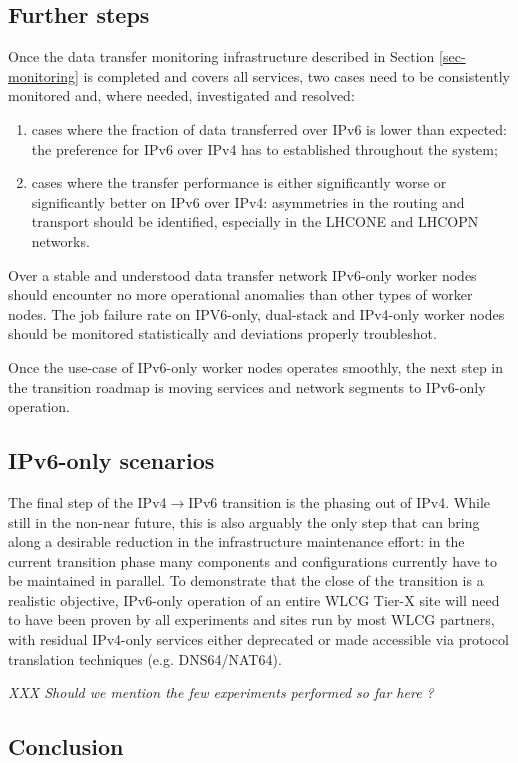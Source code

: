 \subsection{Further steps}
Once the data transfer monitoring infrastructure described in Section
\ref{sec-monitoring} is completed and covers all services, two cases
need to be consistently monitored and, where needed, investigated
and resolved:
\begin{enumerate}
\item cases where the fraction of data transferred over IPv6 is lower than expected:
the preference for IPv6 over IPv4 has to established throughout the system;
\item cases where the transfer performance is either significantly worse 
or significantly better on IPv6 over IPv4: asymmetries in the routing and
transport should be identified, especially in the LHCONE and LHCOPN networks.
\end{enumerate}
\par
Over a stable and understood data transfer network 
IPv6-only worker nodes should encounter no more operational anomalies
than other types of worker nodes. The 
job failure rate on IPV6-only, dual-stack and IPv4-only worker nodes should
be monitored statistically and deviations properly troubleshot.
\par
Once the use-case of IPv6-only worker nodes operates smoothly, the next
step in the transition roadmap is moving services and network segments to
IPv6-only operation.

\subsection{IPv6-only scenarios}
The final step of the IPv4$\rightarrow$IPv6 transition is the phasing out of IPv4. While still in the non-near future,  this is also arguably the only step
that can bring along a desirable reduction
in the infrastructure maintenance effort: in the current transition phase
many components and configurations currently have to be maintained in parallel.
To demonstrate that the close of the transition is a realistic
objective, IPv6-only operation of an entire WLCG Tier-X site will
need to have been proven by all experiments and sites run by most WLCG
partners, with residual IPv4-only services either deprecated or made
accessible via protocol translation techniques (e.g. DNS64/NAT64). 
\par
{\it XXX Should we mention the few experiments performed so far here ?}

\subsection{Conclusion}

